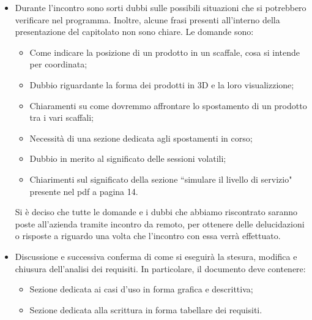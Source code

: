 \begin{itemize}
\begin{itemize}
            \end{itemize}
        \item Durante l'incontro sono sorti dubbi sulle possibili situazioni che si potrebbero verificare nel programma. Inoltre, alcune frasi presenti all'interno della presentazione del capitolato non sono chiare. Le domande sono:
            \begin{itemize}
                \item Come indicare la posizione di un prodotto in un scaffale, cosa si intende per coordinata;
                \item Dubbio riguardante la forma dei prodotti in 3D e la loro visualizzione;
                \item Chiaramenti su come dovremmo affrontare lo spostamento di un prodotto tra i vari scaffali;
                \item Necessità di una sezione dedicata agli spostamenti in corso;
                \item Dubbio in merito al significato delle sessioni volatili;
                \item Chiarimenti sul significato della sezione ``simulare il livello di servizio" presente nel pdf a pagina 14.
            \end{itemize}
        Si è deciso che tutte le domande e i dubbi che abbiamo riscontrato saranno poste all'azienda tramite incontro da remoto, per ottenere delle delucidazioni o risposte a riguardo una volta che l'incontro con essa verrà effettuato.\\
        \item Discussione e successiva conferma di come si eseguirà la stesura, modifica e chiusura dell'analisi dei requisiti. In particolare, il documento deve contenere:
        \begin{itemize}
            \item Sezione dedicata ai casi d'uso in forma grafica e descrittiva;
            \item Sezione dedicata alla scrittura in forma tabellare dei requisiti.
        \end{itemize}
    \end{itemize}